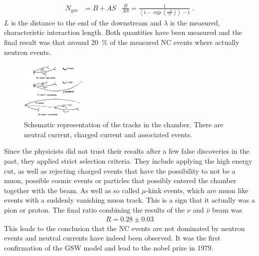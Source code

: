\begin{align*}
  N_{\text{ges}} &= B + AS & \frac{B}{AS} = \frac{1}{\left< 1- \exp\left( \frac{-L}{\lambda} \right)\right> -1}\;.
\end{align*}
$L$ is the distance to the end of the downstream and $\lambda$ is the measured, characteristic interaction length. Both quantities have been measured and the final result was that around \SI{20}{\percent} of the measured NC events where actually neutron events.
	\begin{figure}
	    \includegraphics[width=0.28\textwidth]{graphics/CC_NC_AS.png}
	    \caption{Schematic representation of the tracks in the chamber. There are neutral current, charged current and associated events. \cite{NC_J}}
			\label{fig:NCCCAS}
	  \end{figure}
	  \FloatBarrier

Since the physicists did not trust their results after a few false discoveries in the past, they applied strict selection criteria. They include applying the high energy cut, as well as rejecting charged events that have the possibility to not be a muon, possible cosmic events or particles that possibly entered the chamber together with the beam. As well as so called $\mu$-kink events, which are muon like events with a suddenly vanishing muon track. This is a sign that it actually was a pion or proton.
The final ratio combining the results of the $\nu$ and $\bar{\nu}$ beam was
\begin{align*}
	R = 0.28 \pm 0.03
\end{align*}
This leads to the conclusion that the NC events are not dominated by neutron events and neutral currents have indeed been observed. It was the first confirmation of the GSW model and lead to the nobel prize in 1979.
